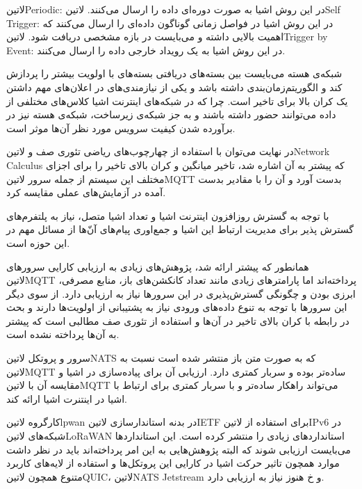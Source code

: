  ‌لاتین{Periodic}: در این روش اشیا به صورت دوره‌ای داده را ارسال می‌کنند.
 ‌لاتین{Self Trigger}: در این روش اشیا در فواصل زمانی گوناگون داده‌ای را ارسال می‌کنند که اهمیت بالایی داشته و می‌بایست در بازه مشخصی دریافت شود.
 ‌لاتین{Trigger by Event}: در این روش اشیا به یک رویداد خارجی داده را ارسال می‌کنند.

شبکه‌ی هسته می‌بایست بین بسته‌های دریافتی بسته‌های با اولویت بیشتر را پردازش کند و الگوریتم‌زمان‌بندی داشته باشد و یکی از نیازمندی‌های در اعلان‌های مهم داشتن یک کران بالا برای تاخیر است.
چرا که در شبکه‌های اینترنت اشیا کلاس‌های مختلفی از داده می‌توانند حضور داشته باشند و به جز شبکه‌ی زیرساخت، شبکه‌ی هسته نیز در برآورده شدن کیفیت سرویس مورد نظر آن‌ها موثر است.

در نهایت می‌توان با استفاده از چهارچوب‌های ریاضی تئوری صف و ‌لاتین{Network Calculus} که پیشتر به آن اشاره شد،
تاخیر میانگین و کران بالای تاخیر را برای اجزای مختلف این سیستم از جمله
سرور ‌لاتین{MQTT} بدست آورد و آن را با مقادیر بدست آمده در آزمایش‌های عملی
مقایسه کرد.


با توجه به گسترش روزافزون اینترنت اشیا و تعداد اشیا متصل، نیاز به پلتفرم‌های گسترش پذیر برای مدیریت ارتباط این اشیا و جمع‌اوری پیام‌های آن‌ّها
از مسائل مهم در این حوزه است.

همانطور که پیشتر ارائه شد، پژوهش‌های زیادی به ارزیابی کارایی سرورهای ‌لاتین{MQTT} پرداخته‌اند اما پارامترهای زیادی مانند تعداد کانکشن‌های باز،
منابع مصرفی، ابرزی بودن و چگونگی گسترش‌پذیری در این سرورها نیاز به ارزیابی دارد. از سوی دیگر این سرورها با توجه به تنوع داده‌های ورودی نیاز به پشتیبانی
از اولویت‌ها دارند و بحث در رابطه با کران بالای تاخیر در آن‌ها و استفاده از تئوری صف مطالبی است که پیشتر به آن‌ها پرداخته نشده است.

سرور و پروتکل ‌لاتین{NATS} که به صورت متن باز منتشر شده است نسبت به ‌لاتین{MQTT} ساده‌تر بوده و سربار کمتری دارد. ارزیابی آن
برای پیاده‌سازی در اشیا و مقایسه آن با ‌لاتین{MQTT} می‌تواند راهکار ساده‌تر و با سربار کمتری برای ارتباط با اشیا در اینتنرت اشیا ارائه کند.


کارگروه ‌لاتین{lpwan} در بدنه استاندارسازی ‌لاتین{IETF} برای استفاده از ‌لاتین{IPv6} در شبکه‌های ‌لاتین{LoRaWAN} استانداردهای زیادی را منتشر کرده است.
این استانداردها می‌بایست ارزیابی شوند که البته پژوهش‌هایی به این امر پرداخته‌اند باید در نظر داشت موارد همچون تاثیر حرکت اشیا در کارایی این پروتکل‌ها و استفاده از لایه‌های کاربرد متنوع همچون ‌لاتین{QUIC}، ‌لاتین{NATS Jetstream} و ‌خ هنوز نیاز به ارزیابی دارد.

